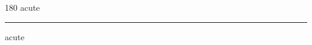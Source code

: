 
\begin{frame}
\begin{center}
\begin{turn}{180}
{\fontsize{2.5cm}{1em}\selectfont acute}
\end{turn}
\vspace{1em}\par  
\hrule
\vspace{1em}\par  
{\fontsize{2.5cm}{1em}\selectfont acute}
\end{center}
\end{frame}
